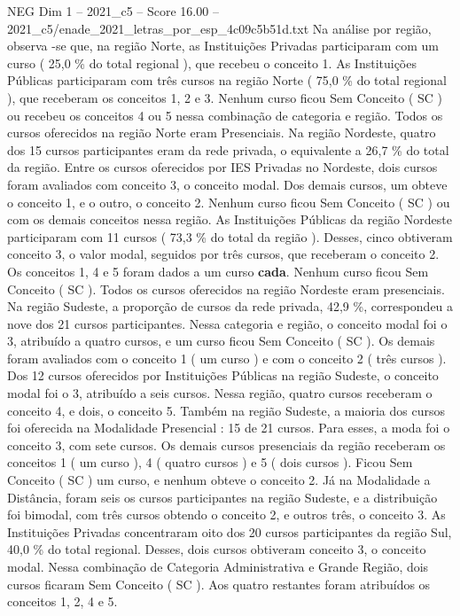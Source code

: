 \begin{textsample}{NEG Dim 1 – 2021\_c5 – Score 16.00 – 2021\_c5/enade\_2021\_letras\_por\_esp\_4c09c5b51d.txt}
Na análise por região, observa -se que, na região Norte, as Instituições Privadas participaram com um curso ( 25,0 \% do total regional ), que recebeu o conceito 1.
As Instituições Públicas participaram com três cursos na região Norte ( 75,0 \% do total regional ), que receberam os conceitos 1, 2 e 3.
Nenhum curso ficou Sem Conceito ( SC ) ou recebeu os conceitos 4 ou 5 nessa combinação de categoria e região.
Todos os cursos oferecidos na região Norte eram Presenciais.
Na região Nordeste, quatro dos 15 cursos participantes eram da rede privada, o equivalente a 26,7 \% do total da região.
Entre os cursos oferecidos por IES Privadas no Nordeste, dois cursos foram avaliados com conceito 3, o conceito modal.
Dos demais cursos, um obteve o conceito 1, e o outro, o conceito 2.
Nenhum curso ficou Sem Conceito ( SC ) ou com os demais conceitos nessa região.
As Instituições Públicas da região Nordeste participaram com 11 cursos ( 73,3 \% do total da região ).
Desses, cinco obtiveram conceito 3, o valor modal, seguidos por três cursos, que receberam o conceito 2.
Os conceitos 1, 4 e 5 foram dados a um curso \textbf{cada}.
Nenhum curso ficou Sem Conceito ( SC ).
Todos os cursos oferecidos na região Nordeste eram presenciais.
Na região Sudeste, a proporção de cursos da rede privada, 42,9 \%, correspondeu a nove dos 21 cursos participantes.
Nessa categoria e região, o conceito modal foi o 3, atribuído a quatro cursos, e um curso ficou Sem Conceito ( SC ).
Os demais foram avaliados com o conceito 1 ( um curso ) e com o conceito 2 ( três cursos ).
Dos 12 cursos oferecidos por Instituições Públicas na região Sudeste, o conceito modal foi o 3, atribuído a seis cursos.
Nessa região, quatro cursos receberam o conceito 4, e dois, o conceito 5.
Também na região Sudeste, a maioria dos cursos foi oferecida na Modalidade Presencial : 15 de 21 cursos.
Para esses, a moda foi o conceito 3, com sete cursos.
Os demais cursos presenciais da região receberam os conceitos 1 ( um curso ), 4 ( quatro cursos ) e 5 ( dois cursos ).
Ficou Sem Conceito ( SC ) um curso, e nenhum obteve o conceito 2.
Já na Modalidade a Distância, foram seis os cursos participantes na região Sudeste, e a distribuição foi bimodal, com três cursos obtendo o conceito 2, e outros três, o conceito 3.
As Instituições Privadas concentraram oito dos 20 cursos participantes da região Sul, 40,0 \% do total regional.
Desses, dois cursos obtiveram conceito 3, o conceito modal.
Nessa combinação de Categoria Administrativa e Grande Região, dois cursos ficaram Sem Conceito ( SC ).
Aos quatro restantes foram atribuídos os conceitos 1, 2, 4 e 5.

\end{textsample}
